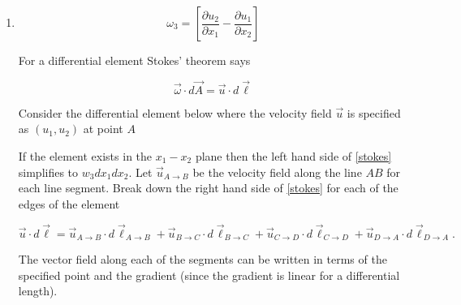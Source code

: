 \documentclass[11pt,twoside]{article}
\newcommand{\p}[2]{\frac{\partial#1}{\partial#2}}
\newcommand{\vect}[1]{\vec{#1}}
\begin{document}
\begin{enumerate}
\begin{enumerate}
\item 
$$\omega_3=\left[\p{u_2}{x_1}-\p{u_1}{x_2}\right]$$

For a differential element Stokes' theorem says

\begin{equation}
\vect{\omega}\cdot d\vect{A}=\vect{u}\cdot d\vect{\ell}\label{stokes}
\end{equation}

Consider the differential element below where the velocity field $\vect{u}$ is specified as $(u_1,u_2)$ at point $A$

\begin{center}

\end{center}

If the element exists in the $x_1-x_2$ plane then the left hand side of \autoref{stokes} simplifies to $w_3dx_1dx_2$. Let $\vect{u}_{A\rightarrow B}$ be the velocity field along the line $AB$ for each line segment. Break down the right hand side of \autoref{stokes} for each of the edges of the element

\begin{equation}
\vect{u}\cdot d\vect{\ell} = 
\vect{u}_{A\rightarrow B}\cdot d\vect{\ell}_{A\rightarrow B} + 
\vect{u}_{B\rightarrow C}\cdot d\vect{\ell}_{B\rightarrow C} +
\vect{u}_{C\rightarrow D}\cdot d\vect{\ell}_{C\rightarrow D} +
\vect{u}_{D\rightarrow A}\cdot d\vect{\ell}_{D\rightarrow A}.
\label{line}
\end{equation}

The vector field along each of the segments can be written in terms of the specified point and the gradient (since the gradient is linear for a differential length).


\end{enumerate}
\end{enumerate}
\end{document}
